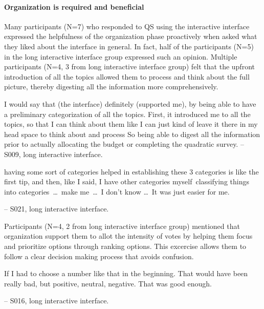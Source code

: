 \paragraph{Organization is required and beneficial}
Many participants (N=7) who responded to QS using the interactive interface expressed the helpfulness of the organization phase proactively when asked what they liked about the interface in general. In fact, half of the participants (N=5) in the long interactive interface group expressed such an opinion. Multiple participants (N=4, 3 from long interactive interface group) felt that the upfront introduction of all the topics allowed them to process and think about the full picture, thereby digesting all the information more comprehensively. 

\begin{displayquote}
I would say that (the interface) definitely (supported me), by being able to have a preliminary categorization of all the topics. First, it introduced me to all the topics, so that I can think about them like I can just kind of leave it there in my head space to think about and process \bracketellipsis So being able to digest all the information prior to actually allocating the budget or completing the quadratic survey. \noindent \hfill -- S009, long interactive interface.
\end{displayquote}

\begin{displayquote}
\bracketellipsis having some sort of categories helped in establishing these 3 categories is like the first tip, and then, like I said, I have other categories myself~\bracketellipsis classifying things into categories~\ldots\ make me~\ldots\ I don't know \ldots\ It was just easier for me. 

\noindent \hfill -- S021, long interactive interface.
\end{displayquote}

Participants (N=4, 2 from long interactive interface group) mentioned that organization support them to allot the intensity of votes by helping them focus and prioritize options through ranking options. This excercise allows them to follow a clear decision making process that avoids confusion.

\begin{displayquote}
If I had to choose a number like that in the beginning. That would have been really bad, but positive, neutral, negative. That was good enough.

\noindent \hfill -- S016, long interactive interface.
\end{displayquote}

